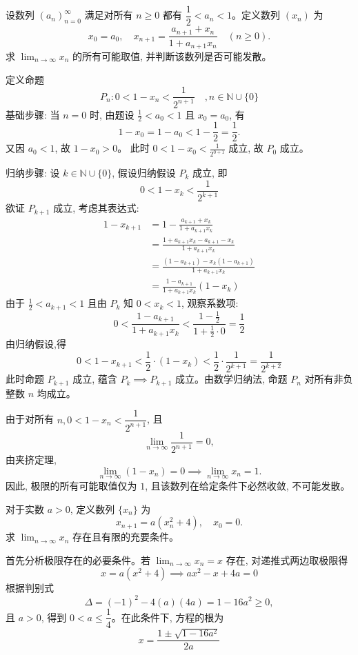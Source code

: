 \begin{questions}
    \question 设数列 $(a_n)_{n=0}^\infty$ 满足对所有 $n \ge 0$ 都有 $\dfrac{1}{2} < a_n < 1$。定义数列 $(x_n)$ 为
    \[
    x_0=a_0,\quad x_{n+1}=\frac{a_{n+1}+x_n}{1+a_{n+1}x_n} \quad (n \ge 0).
    \]
    求 $\displaystyle \lim_{n \to \infty} x_n$ 的所有可能取值, 并判断该数列是否可能发散。
    \begin{solution}
        定义命题 
        \[
        P_n: 0 < 1 - x_n < \frac{1}{2^{n+1}} \quad, n \in \mathbb{N} \cup \{0\}
        \]
        基础步骤: 当 $n=0$ 时, 
        由题设 $\frac{1}{2} < a_0 < 1$ 且 $x_0 = a_0$, 有
        \[
        1 - x_0 = 1 - a_0 < 1 - \frac{1}{2} = \frac{1}{2}.
        \]
        又因 $a_0 < 1$, 故 $1 - x_0 > 0$。
        此时 $0 < 1 - x_0 < \frac{1}{2^{0+1}}$ 成立, 故 $P_0$ 成立。

        归纳步骤: 设 $k \in \mathbb{N} \cup \{0\}$, 假设归纳假设 $P_k$ 成立, 即
        \[
        0 < 1 - x_k < \frac{1}{2^{k+1}}
        \]
        欲证 $P_{k+1}$ 成立, 考虑其表达式:
        \begin{align}
        1 - x_{k+1} &= 1 - \frac{a_{k+1} + x_k}{1 + a_{k+1}x_k} \\
        &= \frac{1 + a_{k+1}x_k - a_{k+1} - x_k}{1 + a_{k+1}x_k} \\
        &= \frac{(1 - a_{k+1}) - x_k(1 - a_{k+1})}{1 + a_{k+1}x_k} \\
        &= \frac{1 - a_{k+1}}{1 + a_{k+1}x_k} (1 - x_k)
        \end{align}
        由于 $\frac{1}{2} < a_{k+1} < 1$ 且由 $P_k$ 知 $0 < x_k < 1$, 观察系数项:
        \[
        0 < \frac{1 - a_{k+1}}{1 + a_{k+1}x_k} < \frac{1 - \frac{1}{2}}{1 + \frac{1}{2} \cdot 0} = \frac{1}{2}
        \]
        由归纳假设,得
        \[
        0 < 1 - x_{k+1} < \frac{1}{2} \cdot (1 - x_k) < \frac{1}{2} \cdot \frac{1}{2^{k+1}} = \frac{1}{2^{k+2}}
        \]
        此时命题 $P_{k+1}$ 成立, 蕴含 $P_k \implies P_{k+1}$ 成立。由数学归纳法, 命题 $P_n$ 对所有非负整数 $n$ 均成立。

        由于对所有 $n,0 < 1 - x_n < \dfrac{1}{2^{n+1}}$, 且 
        \[
        \lim_{n \to \infty} \frac{1}{2^{n+1}} = 0, 
        \]
        由夹挤定理,
        \[
        \lim_{n \to \infty} (1 - x_n) = 0 \implies \lim_{n \to \infty} x_n = 1.
        \]
        因此, 极限的所有可能取值仅为 $1$, 且该数列在给定条件下必然收敛, 不可能发散。
    \end{solution}

    \question 对于实数 $a>0$, 定义数列 $\{x_n\}$ 为
    \[
    x_{n+1}=a(x_n^2+4),\quad x_0=0.
    \]
    求 $\displaystyle \lim_{n\to\infty}x_n$ 存在且有限的充要条件。
    \begin{solution}
        首先分析极限存在的必要条件。若 $\displaystyle \lim_{n\to\infty}x_n=x$ 存在, 对递推式两边取极限得
        \[
        x=a(x^2+4) \implies ax^2 - x + 4a = 0
        \]
        根据判别式 
        \[
        \Delta = (-1)^2 - 4(a)(4a) = 1 - 16a^2 \ge 0, 
        \]
        且 $a>0$, 得到 $0 < a \le \dfrac{1}{4}$。在此条件下, 方程的根为 
        \[
        x = \frac{1 \pm \sqrt{1-16a^2}}{2a}
        \]


\end{solution}
\end{questions}
